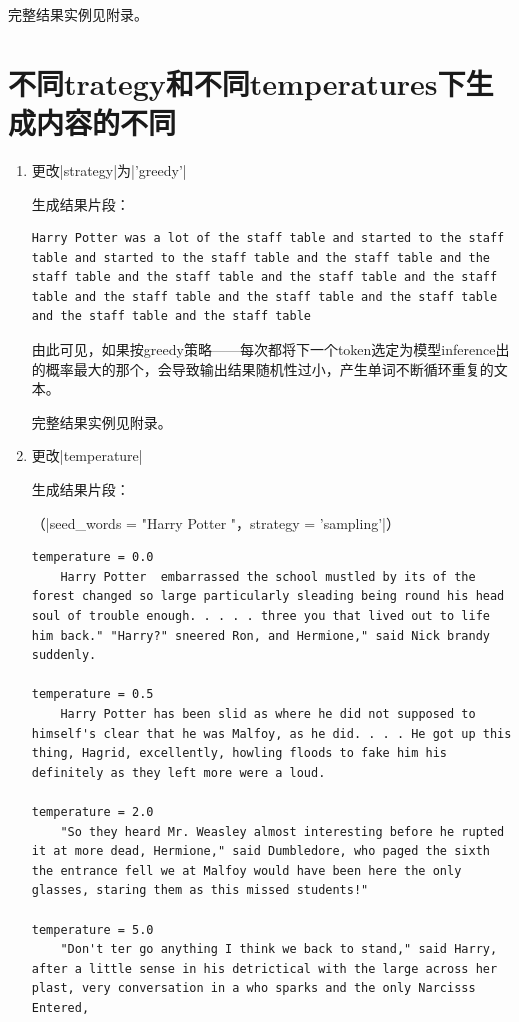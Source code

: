 \documentclass[11pt, a4paper]{article}
\begin{document}
完整结果实例见附录。

\section{不同trategy和不同temperatures下生成内容的不同}
\begin{enumerate}
    \item 更改|strategy|为|'greedy'|

    生成结果片段：
\begin{lstlisting}
Harry Potter was a lot of the staff table and started to the staff table and started to the staff table and the staff table and the staff table and the staff table and the staff table and the staff table and the staff table and the staff table and the staff table and the staff table and the staff table
\end{lstlisting}

    由此可见，如果按greedy策略——每次都将下一个token选定为模型inference出的概率最大的那个，会导致输出结果随机性过小，产生单词不断循环重复的文本。

    完整结果实例见附录。

    \item 更改|temperature|
    
    生成结果片段：
    
    （|seed_words = "Harry Potter "，strategy = 'sampling'|）
\begin{lstlisting}
temperature = 0.0
    Harry Potter  embarrassed the school mustled by its of the forest changed so large particularly sleading being round his head soul of trouble enough. . . . . three you that lived out to life him back." "Harry?" sneered Ron, and Hermione," said Nick brandy suddenly. 

temperature = 0.5
    Harry Potter has been slid as where he did not supposed to himself's clear that he was Malfoy, as he did. . . . He got up this thing, Hagrid, excellently, howling floods to fake him his definitely as they left more were a loud. 

temperature = 2.0
    "So they heard Mr. Weasley almost interesting before he rupted it at more dead, Hermione," said Dumbledore, who paged the sixth the entrance fell we at Malfoy would have been here the only glasses, staring them as this missed students!" 

temperature = 5.0
    "Don't ter go anything I think we back to stand," said Harry,  after a little sense in his detrictical with the large across her plast, very conversation in a who sparks and the only Narcisss Entered,


\end{lstlisting}
\end{enumerate}
\end{document}
